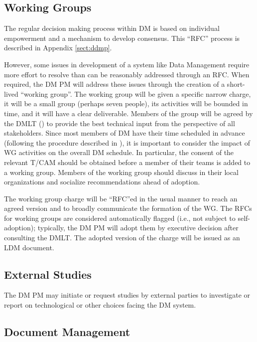 \subsection {Working Groups} \label{sect:wgs}

The regular decision making process within DM is based on individual empowerment and a mechanism to develop consensus.
This ``RFC'' process is described in Appendix \ref{sect:ddmp}.

However, some issues in development of a system like Data Management require more effort to resolve than can be reasonably addressed through an RFC.
When required, the DM PM will address these issues through the creation of a short-lived ``working group''.
The working group will be given a specific narrow charge, it will be a small group (perhaps seven people), its activities will be bounded in time, and it will have a clear deliverable.
Members of the group will be agreed by the DMLT () to provide the best technical input from the perspective of all stakeholders.
Since most members of DM have their time scheduled in advance (following the procedure described in ), it is important to consider the impact of WG activities on the overall DM schedule.
In particular, the consent of the relevant T/CAM should be obtained before a member of their teams is added to a working group.
Members of the working group should discuss in their local organizations and socialize recommendations ahead of adoption.

The working group charge will be ``RFC''ed in the usual manner to reach an agreed version and to broadly communicate the formation of the WG.
The RFCs for working groups are considered automatically flagged (i.e., not
subject to self-adoption); typically, the DM PM will adopt them by executive
decision after consulting the DMLT.  The adopted version of the charge will be issued as an LDM document.


\subsection {External Studies} \label{sect:studies}

The DM PM may initiate or request studies by external parties to investigate or report on technological or other choices facing the DM system.


\subsection {Document Management} \label{sect:docman}

